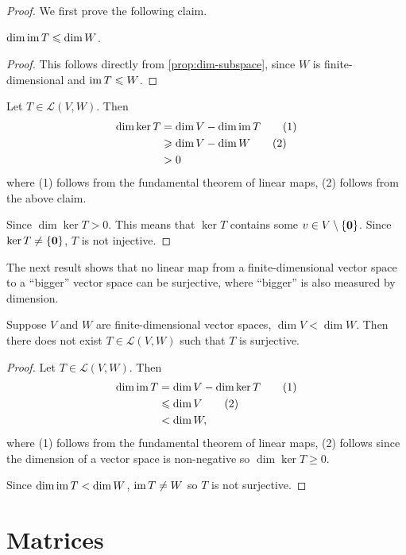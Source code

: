 \begin{proof}
We first prove the following claim.
\begin{claim}
$\dim\operatorname{im} T\leqslant\dim W$.
\end{claim}

\begin{proof}
This follows directly from \cref{prop:dim-subspace}, since $W$ is finite-dimensional and $\operatorname{im} T\leqslant W$.
\end{proof}

Let $T\in\mathcal{L}(V,W)$. Then
\begin{align*}
\dim\ker T&=\dim V-\dim\operatorname{im} T\tag{1}\\
&\geqslant\dim V-\dim W\tag{2}\\
&>0
\end{align*}
where (1) follows from the fundamental theorem of linear maps, (2) follows from the above claim.

Since $\dim\ker T>0$. This means that $\ker T$ contains some $v\in V\setminus\{\vb{0}\}$. Since $\ker T\neq\{\vb{0}\}$, $T$ is not injective.
\end{proof}

The next result shows that no linear map from a finite-dimensional vector space to a ``bigger'' vector space can be surjective, where ``bigger'' is also measured by dimension.

\begin{proposition}
Suppose $V$ and $W$ are finite-dimensional vector spaces, $\dim V<\dim W$. Then there does not exist $T\in\mathcal{L}(V,W)$ such that $T$ is surjective.
\end{proposition}

\begin{proof}
Let $T\in\mathcal{L}(V,W)$. Then
\begin{align*}
\dim\operatorname{im} T&=\dim V-\dim\ker T\tag{1}\\
&\leqslant\dim V\tag{2}\\
&<\dim W,
\end{align*}
where (1) follows from the fundamental theorem of linear maps, (2) follows since the dimension of a vector space is non-negative so $\dim\ker T\ge0$.

Since $\dim\operatorname{im} T<\dim W$, $\operatorname{im} T\neq W$ so $T$ is not surjective.
\end{proof}
\pagebreak

\section{Matrices}
